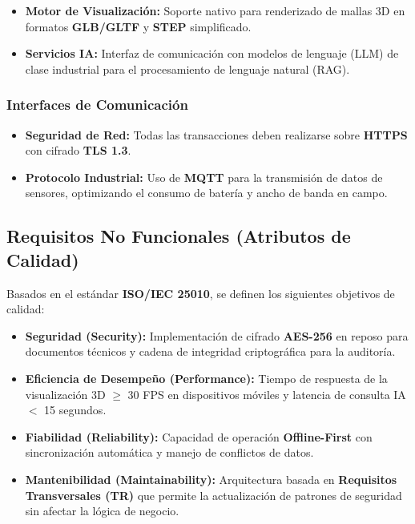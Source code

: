 \begin{itemize}
    \item \textbf{Motor de Visualización:} Soporte nativo para renderizado de mallas 3D en formatos \textbf{GLB/GLTF} y \textbf{STEP} simplificado.
    \item \textbf{Servicios IA:} Interfaz de comunicación con modelos de lenguaje (LLM) de clase industrial para el procesamiento de lenguaje natural (RAG).
\end{itemize}
\subsubsection{Interfaces de Comunicación}

\begin{itemize}
    \item \textbf{Seguridad de Red:} Todas las transacciones deben realizarse sobre \textbf{HTTPS} con cifrado \textbf{TLS 1.3}.
    \item \textbf{Protocolo Industrial:} Uso de \textbf{MQTT} para la transmisión de datos de sensores, optimizando el consumo de batería y ancho de banda en campo.
\end{itemize}
\subsection{Requisitos No Funcionales (Atributos de Calidad)}

Basados en el estándar \textbf{ISO/IEC 25010}, se definen los siguientes objetivos de calidad:

\begin{itemize}
    \item \textbf{Seguridad (Security):} Implementación de cifrado \textbf{AES-256} en reposo para documentos técnicos y cadena de integridad criptográfica para la auditoría.
    \item \textbf{Eficiencia de Desempeño (Performance):} Tiempo de respuesta de la visualización 3D $\ge$ 30 FPS en dispositivos móviles y latencia de consulta IA $<$ 15 segundos.
    \item \textbf{Fiabilidad (Reliability):} Capacidad de operación \textbf{Offline-First} con sincronización automática y manejo de conflictos de datos.
    \item \textbf{Mantenibilidad (Maintainability):} Arquitectura basada en \textbf{Requisitos Transversales (TR)} que permite la actualización de patrones de seguridad sin afectar la lógica de negocio.
\end{itemize}
